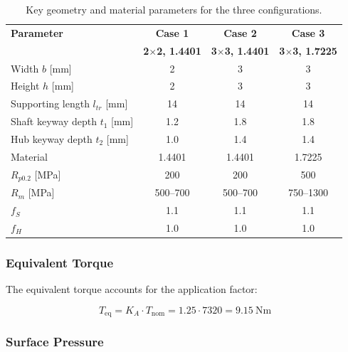 \documentclass[11pt,a4paper,twoside,openright]{book}
\begin{document}
\begin{table}[htbp]
    \centering
    \begin{tabular}{l c c c}
        \hline
        \textbf{Parameter} & \textbf{Case 1} & \textbf{Case 2} & \textbf{Case 3} \\
         & \textbf{2$\times$2, 1.4401} & \textbf{3$\times$3, 1.4401} & \textbf{3$\times$3, 1.7225} \\
        \hline
        Width $b$ [\si{\milli\metre}]              & 2     & 3     & 3 \\
        Height $h$ [\si{\milli\metre}]             & 2     & 3     & 3 \\
        Supporting length $l_{tr}$ [\si{\milli\metre}] & 14    & 14    & 14 \\
        Shaft keyway depth $t_1$ [\si{\milli\metre}]   & 1.2   & 1.8   & 1.8 \\
        Hub keyway depth $t_2$ [\si{\milli\metre}]     & 1.0   & 1.4   & 1.4 \\
        Material                    & 1.4401 & 1.4401 & 1.7225 \\
        $R_{p0.2}$ [\si{\mega\pascal}]           & 200   & 200   & 500 \\
        $R_m$ [\si{\mega\pascal}]                 & 500--700 & 500--700 & 750--1300 \\
        $f_S$                       & 1.1   & 1.1   & 1.1 \\
        $f_H$                       & 1.0   & 1.0   & 1.0 \\
        \hline
    \end{tabular}
    \caption{Key geometry and material parameters for the three configurations.}
    \label{tab:key_geometry}
\end{table}
 
\subsubsection{Equivalent Torque}
 
The equivalent torque accounts for the application factor:
 
\begin{equation}
    T_{\text{eq}} = K_A \cdot T_{\text{nom}} = 1.25 \cdot 7320 = \SI{9.15}{\newton\metre}
    \label{eq:equivalent_torque}
\end{equation}
 
\subsubsection{Surface Pressure}
 
\end{document}
